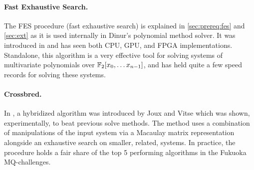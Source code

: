 \paragraph{Fast Exhaustive Search.} The FES procedure (fast exhaustive search) is explained in \cref{sec:prereq:fes} and \cref{sec:ext} as it is used internally in Dinur's polynomial method solver. It was introduced in \cite{ches-2010-23990} and has seen both CPU, GPU, and FPGA implementations. Standalone, this algorithm is a very effective tool for solving systems of multivariate polynomials over $\mathbb{F}_2[x_0,\dots x_{n - 1}]$, and has held quite a few speed records for solving these systems.

\paragraph{Crossbred.} In \cite{cryptoeprint:2017/372}, a hybridized algorithm was introduced by Joux and Vitse which was shown, experimentally, to beat previous solve methods. The method uses a combination of manipulations of the input system via a Macaulay matrix representation alongside an exhaustive search on smaller, related, systems. In practice, the procedure holds a fair share of the top 5 performing algorithms in the Fukuoka MQ-challenges.

